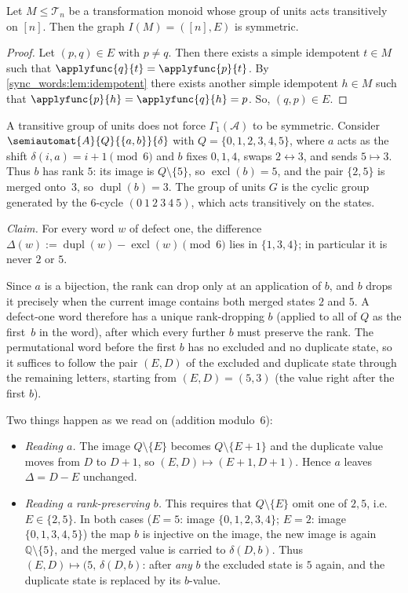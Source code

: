 \begin{proposition}
	\label{sync_max:prop:transitiveIS}
	Let $M \le \mathcal T_n$ be a transformation monoid whose group of units acts
	transitively on $[n]$.
	Then the graph $I(M)=([n],E)$ is symmetric.
\end{proposition}
\begin{proof} 
	Let $(p,q) \in E$ with $p \ne q$. Then there exists a simple idempotent $t \in M$
	such that
	$\applyfunc{q}{t} = \applyfunc{p}{t}$. By \cref{sync_words:lem:idempotent} 
	there exists another simple idempotent $h \in M$
	such that $\applyfunc{p}{h} = \applyfunc{q}{h} = p$.
	So, $(q, p) \in E$.
\end{proof} 

\begin{remark} \label{rem:transitive-not-symmetric}
	A transitive group of units does not force $\Gamma_1(\mathcal A)$ to be symmetric.
	Consider $\semiautomat{A}{Q}{\{a,b\}}{\delta}$ with $Q = \{0,1,2,3,4,5\}$, where
	$a$ acts as the shift $\delta(i,a)=i+1\pmod 6$ and $b$ fixes $0,1,4$, swaps $2\leftrightarrow 3$, and
	sends $5\mapsto 3$. Thus $b$ has rank $5$: its image is $Q\setminus\{5\}$, so
	$\operatorname{excl}(b)=5$, and the pair $\{2,5\}$ is merged onto~$3$, so $\operatorname{dupl}(b)=3$.
	The group of units $G$ is the cyclic group generated by the $6$-cycle
	$(0~1~2~3~4~5)$, which acts transitively on the states.
	
	\emph{Claim.} For every word $w$ of defect one, the difference
	$\Delta(w):=\operatorname{dupl}(w)-\operatorname{excl}(w)\pmod 6$ lies in $\{1,3,4\}$; in particular it is
	never $2$ or $5$.
	
	Since $a$ is a bijection, the rank can drop only at an application of $b$, and $b$ drops it precisely
	when the current image contains both merged states $2$ and $5$. A defect-one word therefore has a unique
	rank-dropping $b$ (applied to all of $Q$ as the first~$b$ in the word), 
	after which every further $b$ must preserve the rank.
	The permutational word before the first $b$ has no excluded and no duplicate state, 
	so it suffices to follow the pair $(E,D)$ of the excluded and duplicate state through the remaining letters, starting from
	$(E,D)=(5,3)$ (the value right after the first $b$).
	
	Two things happen as we read on (addition modulo~$6$):
	\begin{itemize}
		\item \emph{Reading $a$.} The image $Q\setminus\{E\}$ becomes $Q\setminus\{E+1\}$
		and the duplicate value moves from $D$ to $D+1$, so $(E,D)\mapsto(E+1,D+1)$. Hence $a$ leaves
		$\Delta=D-E$ unchanged.
		\item \emph{Reading a rank-preserving $b$.} This requires that $Q\setminus\{E\}$ omit one of
		$2,5$, i.e.\ $E\in\{2,5\}$. In both cases ($E=5$: image $\{0,1,2,3,4\}$; $E=2$: image
		$\{0,1,3,4,5\}$) the map $b$ is injective on the image, the new image is again
		$\mathbb Q\setminus\{5\}$, and the merged value is carried to $\delta(D,b)$. Thus
		$(E,D)\mapsto(5,\,\delta(D,b)$: after \emph{any} $b$ the excluded state is $5$ again, and the duplicate
		state is replaced by its $b$-value.
	\end{itemize}
	

\end{remark}
